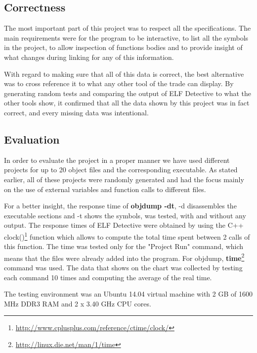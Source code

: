 \subsection{Correctness}
\label{sec:correctness}

The most important part of this project was to respect all the specifications. The main requirements were for the program to be interactive, to list all the symbols in the project, to allow inspection of functions bodies and to provide insight of what changes during linking for any of this information.

With regard to making sure that all of this data is correct, the best alternative was to cross reference it to what any other tool of the trade can display. By generating random tests and comparing the output of ELF Detective to what the other tools show, it confirmed that all the data shown by this project was in fact correct, and every missing data was intentional.

\subsection{Evaluation}
\label{sec:eval}

In order to evaluate the project in a proper manner we have used different projects for up to 20 object files and the corresponding executable. As stated earlier, all of these projects were randomly generated and had the focus mainly on the use of external variables and function calls to different files.


For a better insight, the response time of \textbf{objdump -{}dt}, -{}d disassembles the executable sections and -{}t shows the symbols, was tested, with and without any output. The response times of ELF Detective were obtained by using the C++ clock()\footnote{\url{http://www.cplusplus.com/reference/ctime/clock/}} function which allows to compute the total time spent between 2 calls of this function. The time was tested only for the "Project Run" command, which means that the files were already added into the program. For objdump,  \textbf{time}\footnote{\url{http://linux.die.net/man/1/time}} command was used. The data that shows on the chart was collected by testing each command 10 times and computing the average of the real time.

The testing environment was an Ubuntu 14.04 virtual machine with 2 GB of 1600 MHz DDR3 RAM and 2 x 3.40 GHz CPU cores. 

